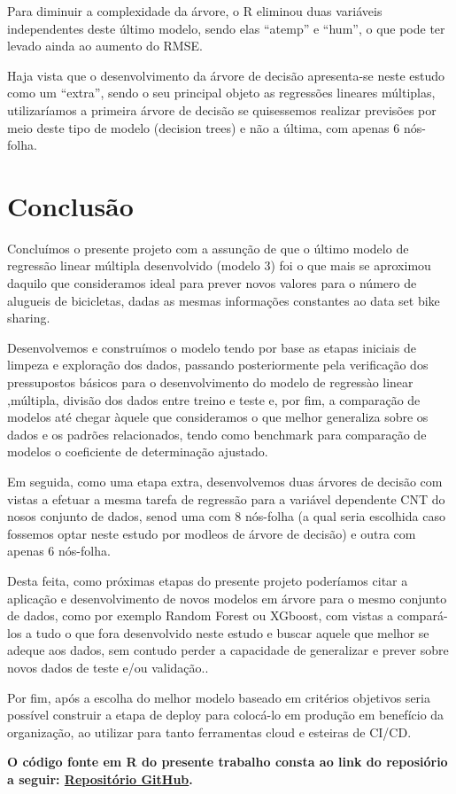 \documentclass[
  letterpaper,
  DIV=11,
  numbers=noendperiod]{scrartcl}
\begin{document}
Para diminuir a complexidade da árvore, o R eliminou duas variáveis
independentes deste último modelo, sendo elas ``atemp'' e ``hum'', o que
pode ter levado ainda ao aumento do RMSE.

Haja vista que o desenvolvimento da árvore de decisão apresenta-se neste
estudo como um ``extra'', sendo o seu principal objeto as regressões
lineares múltiplas, utilizaríamos a primeira árvore de decisão se
quisessemos realizar previsões por meio deste tipo de modelo (decision
trees) e não a última, com apenas 6 nós-folha.

\section{Conclusão}\label{conclusuxe3o}

Concluímos o presente projeto com a assunção de que o último modelo de
regressão linear múltipla desenvolvido (modelo 3) foi o que mais se
aproximou daquilo que consideramos ideal para prever novos valores para
o número de alugueis de bicicletas, dadas as mesmas informações
constantes ao data set bike sharing.

Desenvolvemos e construímos o modelo tendo por base as etapas iniciais
de limpeza e exploração dos dados, passando posteriormente pela
verificação dos pressupostos básicos para o desenvolvimento do modelo de
regressào linear ,múltipla, divisão dos dados entre treino e teste e,
por fim, a comparação de modelos até chegar àquele que consideramos o
que melhor generaliza sobre os dados e os padrões relacionados, tendo
como benchmark para comparação de modelos o coeficiente de determinação
ajustado.

Em seguida, como uma etapa extra, desenvolvemos duas árvores de decisão
com vistas a efetuar a mesma tarefa de regressão para a variável
dependente CNT do nosos conjunto de dados, senod uma com 8 nós-folha (a
qual seria escolhida caso fossemos optar neste estudo por modleos de
árvore de decisão) e outra com apenas 6 nós-folha.

Desta feita, como próximas etapas do presente projeto poderíamos citar a
aplicação e desenvolvimento de novos modelos em árvore para o mesmo
conjunto de dados, como por exemplo Random Forest ou XGboost, com vistas
a compará-los a tudo o que fora desenvolvido neste estudo e buscar
aquele que melhor se adeque aos dados, sem contudo perder a capacidade
de generalizar e prever sobre novos dados de teste e/ou validação..

Por fim, após a escolha do melhor modelo baseado em critérios objetivos
seria possível construir a etapa de deploy para colocá-lo em produção em
benefício da organização, ao utilizar para tanto ferramentas cloud e
esteiras de CI/CD.

\textbf{O código fonte em R do presente trabalho consta ao link do
reposiório a seguir:
\href{https://github.com/mello-pedro/SUPERV_ML_MCDE_23_24/blob/main/R_SOURCE_CODE_BIKE_SHARING.qmd}{Repositório
GitHub}.}
\end{document}

